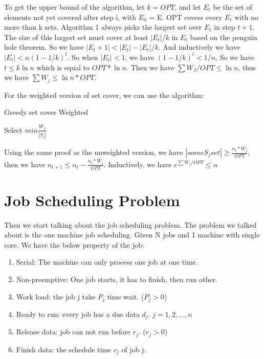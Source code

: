 \documentclass[usletter]{article}
\begin{document}
To get the upper bound of the algorithm, let $k = OPT$, and let $E_{t}$ be the set of elements not yet covered after step i, with $E_{0}$ = E. OPT covers every $E_{t}$ with no more than k sets. Algorithm 1 always picks the largest set over $E_{t}$ in step $t+1$. The size of this largest set must cover at least $|E_{t}|/k$ in $E_{t}$ based on the penguin hole theorem. So we have $|E_{t}+1| < |E_{t}| - |E_{t}|/k$. And inductively we have $|E_{t}| < n(1-1/k)^t$.
So when $|E_{t}| < 1$, we have $(1-1/k)^t < 1/n$, So we have $t \le k\ln{n}$ which is equal to $OPT*\ln{n}$. Then we have $\sum{W_J}/OPT \le \ln{n}$, thus we have $\sum{W_j} \le \ln{n}*OPT$.

For the weighted version of set cover, we can use the algorithm:
\begin{algorithm}
\caption{Greedy set cover Weighted}
\begin{algorithmic}[1]
	\State Select $min \frac{W_{j}}{|S_{j}|}$
\EndWhile
\end{algorithmic}
\end{algorithm}

Using the same proof as the unweighted version, we have $|some S_{j} set| \ge \frac{n_{t}*W_{j}}{OPT}$, then we have $n_{t+1} \le n_{t} - \frac{n_{t}*W_{j}}{OPT}$. Inductively, we have $e^{\sum{W_j}/OPT} \le n$
 
\section{Job Scheduling Problem}
Then we start talking about the job scheduling problem. The problem we talked about is the one machine job scheduling. Given N jobs and 1 machine with single core. We have the below property of the job:
\begin{enumerate}
	\item Serial: The machine can only process one job at one time.
	\item Non-preemptive: One job starts, it has to finish, then run other.
	\item Work load: the job j take $P_{j}$ time wait. ($P_{j} > 0$)
	\item Ready to run: every job has a due data $d_{j}$. $j = 1, 2, ..., n$
	\item Release data: job can not run before $r_{j}$. ($r_{j} > 0$)
	\item Finish data: the schedule time $c_{j}$ of job j. 
\end{enumerate}
\end{document}
